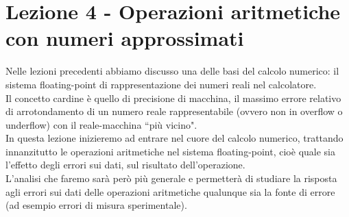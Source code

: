 \documentclass[12pt]{article}
\begin{document}
\section{Lezione 4 - Operazioni aritmetiche con numeri approssimati}
Nelle lezioni precedenti abbiamo discusso una delle basi del calcolo numerico: il sistema floating-point di rappresentazione dei numeri reali nel calcolatore. \\
Il concetto cardine è quello di precisione di macchina, il massimo errore relativo di arrotondamento di un numero reale rappresentabile (ovvero non in overflow o underflow) con il reale-macchina ``più vicino".\\
In questa lezione inizieremo ad entrare nel cuore del calcolo numerico, trattando innanzitutto le operazioni aritmetiche nel sistema floating-point, cioè quale sia l’effetto degli errori sui dati, sul risultato dell'operazione.\\
L'analisi che faremo sarà però più generale e permetterà di studiare la risposta agli errori sui dati delle operazioni aritmetiche qualunque sia la fonte di errore (ad esempio errori di misura sperimentale).
\end{document}
